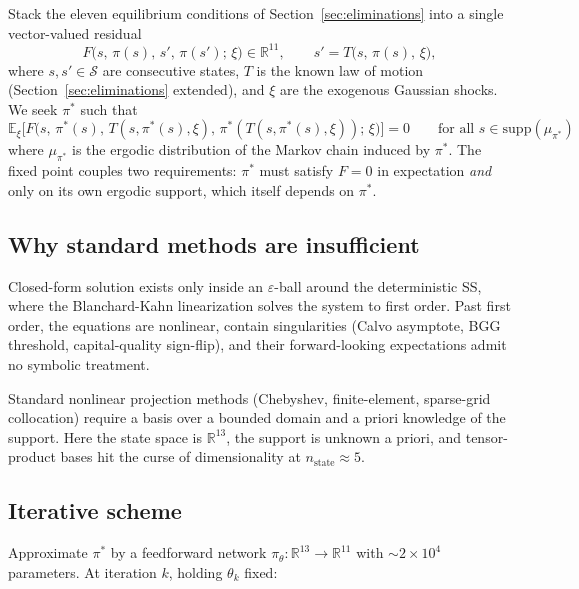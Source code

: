 \documentclass[11pt]{article}
\begin{document}
Stack the eleven equilibrium conditions of Section~\ref{sec:eliminations}
into a single vector-valued residual
\[
F\big(s,\, \pi(s),\, s',\, \pi(s');\, \xi\big) \in \mathbb{R}^{11},
\qquad
s' = T\big(s,\, \pi(s),\, \xi\big),
\]
where $s, s' \in \mathcal{S}$ are consecutive states, $T$ is the known
law of motion (Section~\ref{sec:eliminations} extended), and $\xi$ are
the exogenous Gaussian shocks. We seek $\pi^*$ such that
\[
\mathbb{E}_\xi\Big[F\big(s,\, \pi^*(s),\, T(s, \pi^*(s), \xi),\, \pi^*(T(s, \pi^*(s), \xi));\, \xi\big)\Big] = 0
\qquad \text{for all } s \in \mathrm{supp}(\mu_{\pi^*})
\]
where $\mu_{\pi^*}$ is the ergodic distribution of the Markov chain
induced by $\pi^*$. The fixed point couples two requirements: $\pi^*$
must satisfy $F = 0$ in expectation \emph{and} only on its own ergodic
support, which itself depends on $\pi^*$.

\subsection{Why standard methods are insufficient}

Closed-form solution exists only inside an $\varepsilon$-ball around the
deterministic SS, where the Blanchard-Kahn linearization solves the
system to first order. Past first order, the equations are nonlinear,
contain singularities (Calvo asymptote, BGG threshold, capital-quality
sign-flip), and their forward-looking expectations admit no symbolic
treatment.

Standard nonlinear projection methods (Chebyshev, finite-element,
sparse-grid collocation) require a basis over a bounded domain and a
priori knowledge of the support. Here the state space is
$\mathbb{R}^{13}$, the support is unknown a priori, and tensor-product
bases hit the curse of dimensionality at $n_\text{state} \approx 5$.

\subsection{Iterative scheme}

Approximate $\pi^*$ by a feedforward network
$\pi_\theta : \mathbb{R}^{13} \to \mathbb{R}^{11}$ with $\sim\!2\times
10^{4}$ parameters. At iteration $k$, holding $\theta_k$ fixed:
\end{document}
